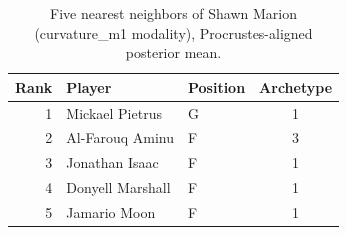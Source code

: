 \begin{table}[htbp]
  \centering\small
  \begin{tabular}{rllc}
    \toprule
    Rank & Player & Position & Archetype \\
    \midrule
    1 & Mickael Pietrus & G & 1 \\
    2 & Al-Farouq Aminu & F & 3 \\
    3 & Jonathan Isaac & F & 1 \\
    4 & Donyell Marshall & F & 1 \\
    5 & Jamario Moon & F & 1 \\
    \bottomrule
  \end{tabular}
  \caption{Five nearest neighbors of Shawn Marion (curvature_m1 modality), Procrustes-aligned posterior mean.}
  \label{tab:Shawn_Marion_neighbors_curvature_m1}
\end{table}

